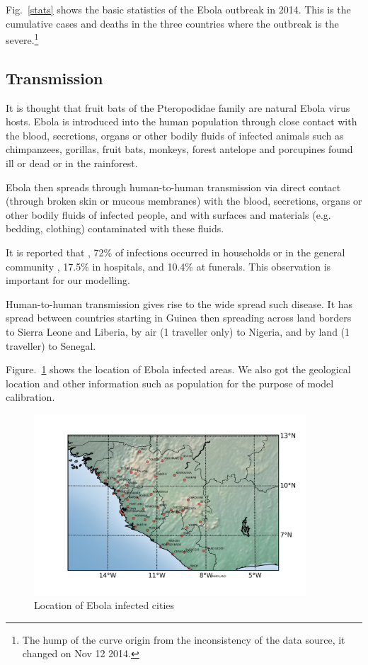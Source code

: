 \documentclass[11pt]{article}
\begin{document}
Fig.~\ref{stats} shows the basic statistics of the Ebola outbreak in 2014. This is the cumulative cases and deaths in the three countries where the outbreak is the severe.\footnote{The hump of the curve origin from the inconsistency of the data source, it changed on Nov 12 2014.}



\subsection{Transmission}

It is thought that fruit bats of the Pteropodidae family are natural Ebola virus hosts. Ebola is introduced into the human population through close contact with the blood, secretions, organs or other bodily fluids of infected animals such as chimpanzees, gorillas, fruit bats, monkeys, forest antelope and porcupines found ill or dead or in the rainforest.


Ebola then spreads through human-to-human transmission via direct contact (through broken skin or mucous membranes) with the blood, secretions, organs or other bodily fluids of infected people, and with surfaces and materials (e.g. bedding, clothing) contaminated with these fluids.

It is reported that \cite{merler2015spatiotemporal}, 72\%  of infections occurred in households or in the general community , 17.5\% in hospitals, and 10.4\% at funerals. This observation is important for our modelling.

Human-to-human transmission gives rise to the wide spread such disease. It has spread between countries starting in Guinea then spreading across land borders to Sierra Leone and Liberia, by air (1 traveller only) to Nigeria, and by land (1 traveller) to Senegal.\cite{ebolanew}

Figure.~\ref{cities} shows the location of Ebola infected areas. We also got the geological location and other information such as population for the purpose of model calibration.

\begin{figure}[hbtp]
\begin{center}
  \includegraphics[width=4in]{graph/map3.png}
  \caption{Location of Ebola infected cities}
  \label{cities}
\end{center}  
\end{figure}
\end{document}
